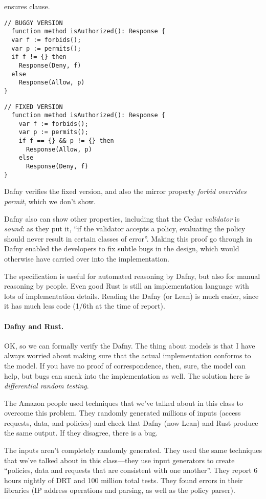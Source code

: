 \documentclass[11pt]{article}
\begin{document}
ensures clause.
\begin{center}
\begin{minipage}{.45\textwidth}
\begin{lstlisting}[language=dafny]
  // BUGGY VERSION
  function method isAuthorized(): Response { 
  var f := forbids();
  var p := permits();
  if f != {} then
    Response(Deny, f)
  else
    Response(Allow, p)
}
\end{lstlisting} \end{minipage} \begin{minipage}{.45\textwidth}
  \begin{lstlisting}[language=dafny]
  // FIXED VERSION
  function method isAuthorized(): Response {
    var f := forbids();
    var p := permits();
    if f == {} && p != {} then
      Response(Allow, p)
    else
      Response(Deny, f)
}
  \end{lstlisting}
\end{minipage}
\end{center}
Dafny verifies the fixed version, and also the mirror property \emph{forbid overrides permit}, which we don't show.

Dafny also can show other properties, including that the Cedar \emph{validator} is \emph{sound}: as they put it,
``if the validator accepts a policy, evaluating the policy should never result in certain classes of error''.
Making this proof go through in Dafny enabled the developers to fix subtle bugs in the design, which would otherwise
have carried over into the implementation.

The specification is useful for automated reasoning by Dafny, but also for manual reasoning
by people. Even good Rust is still an implementation language with lots of implementation details.
Reading the Dafny (or Lean) is much easier, since it has much less code (1/6th at the time of report).

\paragraph{Dafny and Rust.} OK, so we can formally verify the Dafny. The thing about models is that
I have always worried about making sure that the actual implementation conforms to the model. If you have
no proof of correspondence, then, sure, the model can help, but bugs can sneak into the implementation as well.
The solution here is \emph{differential random testing}.

The Amazon people used techniques that we've talked about in this class to overcome this problem.
They randomly generated millions of inputs (access requests, data, and policies) and check that Dafny (now Lean)
and Rust produce the same output. If they disagree, there is a bug.

The inputs aren't completely randomly generated. They used the same techniques that we've talked about in
this class---they use input generators to create ``policies, data and requests that are consistent with one another''.
They report 6 hours nightly of DRT and 100 million total tests. They found errors in their libraries
(IP address operations and parsing, as well as the policy parser).




\end{document}
